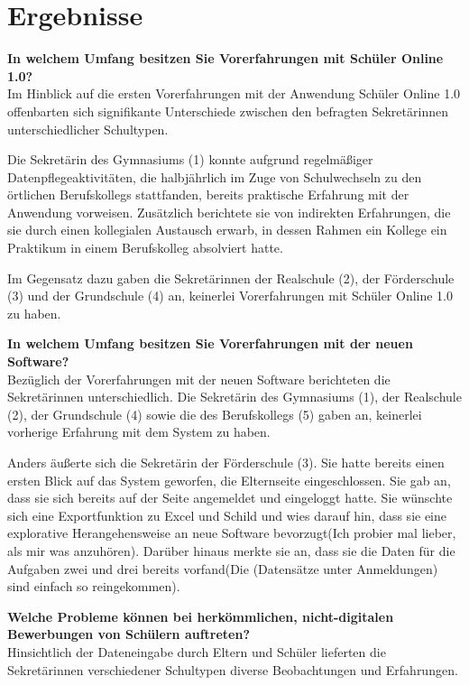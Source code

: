 \pagebreak
\section{Ergebnisse}

\textbf{In welchem Umfang besitzen Sie Vorerfahrungen mit Schüler Online 1.0?}\\
Im Hinblick auf die ersten Vorerfahrungen mit der Anwendung Schüler Online 1.0 offenbarten sich signifikante Unterschiede zwischen den befragten Sekretärinnen unterschiedlicher Schultypen.

Die Sekretärin des Gymnasiums (1) konnte aufgrund regelmäßiger Datenpflegeaktivitäten, die halbjährlich im Zuge von Schulwechseln zu den örtlichen Berufskollegs stattfanden, bereits praktische Erfahrung mit der Anwendung vorweisen. Zusätzlich berichtete sie von indirekten Erfahrungen, die sie durch einen kollegialen Austausch erwarb, in dessen Rahmen ein Kollege ein Praktikum in einem Berufskolleg absolviert hatte.

Im Gegensatz dazu gaben die Sekretärinnen der Realschule (2), der Förderschule (3) und der Grundschule (4) an, keinerlei Vorerfahrungen mit Schüler Online 1.0 zu haben.


\textbf{In welchem Umfang besitzen Sie Vorerfahrungen mit der neuen Software?}\\
Bezüglich der Vorerfahrungen mit der neuen Software berichteten die Sekretärinnen unterschiedlich. Die Sekretärin des Gymnasiums (1), der Realschule (2), der Grundschule (4) sowie die des Berufskollegs (5) gaben an, keinerlei vorherige Erfahrung mit dem System zu haben.

Anders äußerte sich die Sekretärin der Förderschule (3). Sie hatte bereits einen ersten Blick auf das System geworfen, die Elternseite eingeschlossen. Sie gab an, dass sie sich bereits auf der Seite angemeldet und eingeloggt hatte. Sie wünschte sich eine Exportfunktion zu Excel und Schild und wies darauf hin, dass sie eine explorative Herangehensweise an neue Software bevorzugt(\glqq Ich probier mal lieber, als mir was anzuhören\grqq{}). Darüber hinaus merkte sie an, dass sie die Daten für die Aufgaben zwei und drei bereits vorfand(\glqq Die (Datensätze unter Anmeldungen) sind einfach so reingekommen\grqq{}).

\textbf{Welche Probleme können bei herkömmlichen, nicht-digitalen Bewerbungen von Schülern auftreten?}\\
Hinsichtlich der Dateneingabe durch Eltern und Schüler lieferten die Sekretärinnen verschiedener Schultypen diverse Beobachtungen und Erfahrungen.


